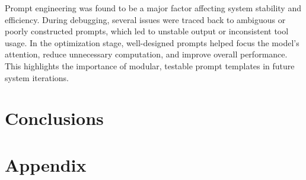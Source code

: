 \documentclass[final-report]{report-template}
\begin{document}
Prompt engineering was found to be a major factor affecting system stability and efficiency. During debugging, several issues were traced back to ambiguous or poorly constructed prompts, which led to unstable output or inconsistent tool usage. In the optimization stage, well-designed prompts helped focus the model’s attention, reduce unnecessary computation, and improve overall performance. This highlights the importance of modular, testable prompt templates in future system iterations.





\section{Conclusions}






\newpage
\section{Appendix}




\newpage

\end{document}
